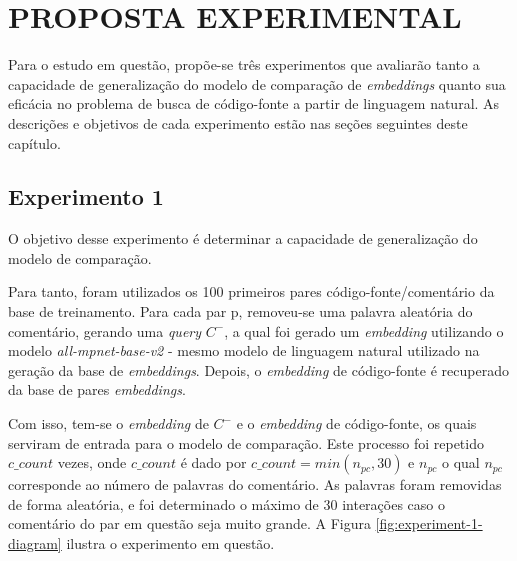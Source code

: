 \chapter{PROPOSTA EXPERIMENTAL}
\label{chp:experiments}

Para o estudo em questão, propõe-se três experimentos que avaliarão tanto a capacidade de generalização do modelo de comparação de \textit{embeddings} quanto sua eficácia no problema de busca de código-fonte a partir de linguagem natural. As descrições e objetivos de cada experimento estão nas seções seguintes deste capítulo.

\section{Experimento 1}
\label{sec:experiments:experiment-1}
O objetivo desse experimento é determinar a capacidade de generalização do modelo de comparação.

Para tanto, foram utilizados os 100 primeiros pares código-fonte/comentário da base de treinamento. Para cada par p, removeu-se uma palavra aleatória do comentário, gerando uma \textit{query} $C^-$, a qual foi gerado um \textit{embedding} utilizando o modelo \textit{all-mpnet-base-v2} - mesmo modelo de linguagem natural utilizado na geração da base de \textit{embeddings}. Depois, o \textit{embedding} de código-fonte é recuperado da base de pares \textit{embeddings}. 

Com isso, tem-se o \textit{embedding} de $C^-$ e o \textit{embedding} de código-fonte, os quais serviram de entrada para o modelo de comparação. Este processo foi repetido $c\_count$ vezes, onde $c\_count$ é dado por $c\_count = min(n_{pc}, 30)$ e $n_{pc}$ o qual $n_{pc}$ corresponde ao número de palavras do comentário. As palavras foram removidas de forma aleatória, e foi determinado o máximo de 30 interações caso o comentário do par em questão seja muito grande. A Figura \ref{fig:experiment-1-diagram} ilustra o experimento em questão.

